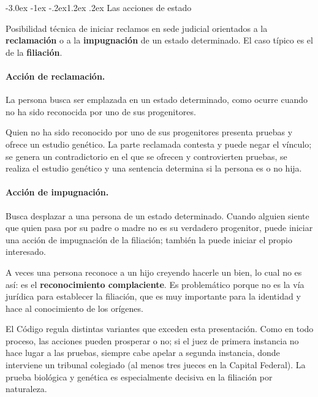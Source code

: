 \documentclass[12pt,oneside]{book}
\makeatletter
\renewcommand\section{\@startsection{section}{1}{\z@}%
  {-3.0ex \@plus -1ex \@minus -.2ex}{1.2ex \@plus .2ex}%
  {\normalfont\large\bfseries\color{acento}}}
\makeatother
\begin{document}
\section{Las acciones de estado}

\begin{definicion}
Posibilidad técnica de iniciar reclamos en sede judicial orientados a la \textbf{reclamación} o a la \textbf{impugnación} de un estado determinado. El caso típico es el de la \textbf{filiación}.
\end{definicion}

\paragraph{Acción de reclamación.} La persona busca ser emplazada en un estado determinado, como ocurre cuando no ha sido reconocida por uno de sus progenitores.

\begin{ejemplo}
Quien no ha sido reconocido por uno de sus progenitores presenta pruebas y ofrece un estudio genético. La parte reclamada contesta y puede negar el vínculo; se genera un contradictorio en el que se ofrecen y controvierten pruebas, se realiza el estudio genético y una sentencia determina si la persona es o no hija.
\end{ejemplo}

\paragraph{Acción de impugnación.} Busca desplazar a una persona de un estado determinado. Cuando alguien siente que quien pasa por su padre o madre no es su verdadero progenitor, puede iniciar una acción de impugnación de la filiación; también la puede iniciar el propio interesado.

\begin{importante}
A veces una persona reconoce a un hijo creyendo hacerle un bien, lo cual no es así: es el \textbf{reconocimiento complaciente}. Es problemático porque no es la vía jurídica para establecer la filiación, que es muy importante para la identidad y hace al conocimiento de los orígenes.
\end{importante}

El Código regula distintas variantes que exceden esta presentación. Como en todo proceso, las acciones pueden prosperar o no; si el juez de primera instancia no hace lugar a las pruebas, siempre cabe apelar a segunda instancia, donde interviene un tribunal colegiado (al menos tres jueces en la Capital Federal). La prueba biológica y genética es especialmente decisiva en la filiación por naturaleza.
\end{document}
